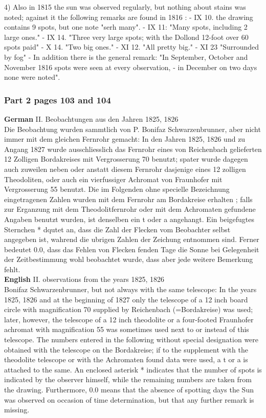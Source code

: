 \documentclass[12pt]{article}
\begin{document}
4) Also in 1815 the sun was observed regularly, but nothing about stains was noted; against it the following remarks are found in 1816 : 
- IX 10. the drawing contains 9 spots, but one note "serh many". 
- IX 11: "Many spots, including 2 large ones."
- IX 14. "Three very large spots; with the Dollond 12-foot over 60 spots paid" 
- X 14. "Two big ones."
- XI 12. "All pretty big."
- XI 23 "Surrounded by fog" - In addition there is the general remark: "In September, October and November 1816 spots were seen at every observation, - in December on two days none were noted".

\subsubsection{Part 2 pages 103 and 104}\label{mitt:rub 684 part 2}
\textbf{German}
II. Beobachtungen aus den Jahren 1825, 1826 \\

Die Beobachtung wurden sammtlich von P. Bonifaz Schwarzenbrunner, aber nicht immer mit dem gleichen Fernrohr gemacht: In den Jahren 1825, 1826 und zu Angang 1827 wurde ausschliesslich das Fernrohr eines von Reichenbach gelieferten 12 Zolligen Bordakreises mit Vergrosserung 70 benutzt; spater wurde dagegen auch zuweilen neben oder anstatt diesem Fernrohr dasjenige eines 12 zolligen Theodoliten, oder auch ein vierfussiger Achromat von Fraunhofer mit Vergrosserung 55 benutzt. Die im Folgenden ohne specielle Bezeichnung eingetragenen Zahlen wurden mit dem Fernrohr am Bordakreise erhalten ; falls zur Erganzung mit dem Theodolitfernrohr oder mit dem Achromaten gefundene Angaben benutzt wurden, ist denselben ein t oder a angehangt. Ein beigefugtes Sternchen * dqutet an, dass die Zahl der Flecken vom Beobachter selbst angegeben ist, wahrend die ubrigen Zahlen der Zeichung entnommen sind. Ferner bedeutet 0.0, dass das Fehlen von Flecken fenden Tage die Sonne bei Gelegenheit der Zeitbestimmung wohl beobachtet wurde, dass aber jede weitere Bemerkung fehlt.\\

\textbf{English}
II. observations from the years 1825, 1826 \\

Bonifaz Schwarzenbrunner, but not always with the same telescope: In the years 1825, 1826 and at the beginning of 1827 only the telescope of a 12 inch board circle with magnification 70 supplied by Reichenbach (=Bordakreise) was used; later, however, the telescope of a 12 inch theodolite or a four-footed Fraunhofer achromat with magnification 55 was sometimes used next to or instead of this telescope. The numbers entered in the following without special designation were obtained with the telescope on the Bordakreise; if to the supplement with the theodolite telescope or with the Achromaten found data were used, a t or a is attached to the same. An enclosed asterisk * indicates that the number of spots is indicated by the observer himself, while the remaining numbers are taken from the drawing. Furthermore, 0.0 means that the absence of spotting days the Sun was observed on occasion of time determination, but that any further remark is missing.\\
\end{document}
